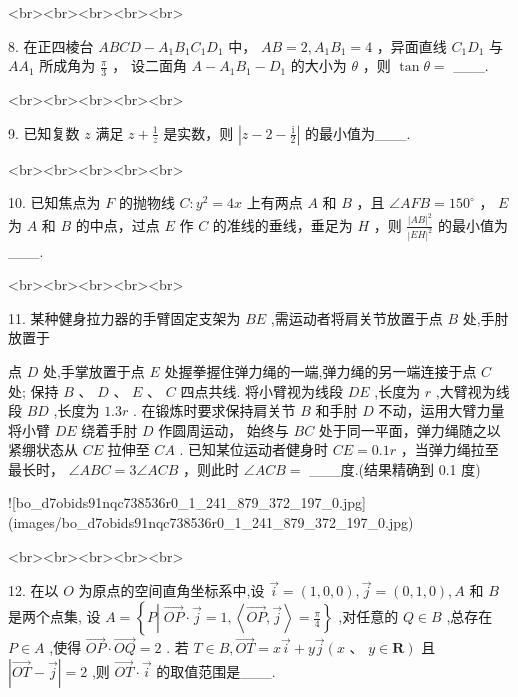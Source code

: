 \documentclass[11pt,a4paper]{article}
\begin{document}
<br><br><br><br><br>


8. 在正四棱台 ${ABCD} - {A}_{1}{B}_{1}{C}_{1}{D}_{1}$ 中， ${AB} = 2,{A}_{1}{B}_{1} = 4$ ，异面直线 ${C}_{1}{D}_{1}$ 与 $A{A}_{1}$ 所成角为 $\frac{\pi }{3}$ ， 设二面角 $A - {A}_{1}{B}_{1} - {D}_{1}$ 的大小为 $\theta$ ，则 $\tan \theta  =$ ___.




<br><br><br><br><br>


9. 已知复数 $z$ 满足 $z + \frac{1}{z}$ 是实数，则 $\left| {z - 2 - \frac{\mathrm{i}}{2}}\right|$ 的最小值为___.




<br><br><br><br><br>


10. 已知焦点为 $F$ 的抛物线 $C : {y}^{2} = {4x}$ 上有两点 $A$ 和 $B$ ，且 $\angle {AFB} = {150}^{ \circ  }$ ， $E$ 为 $A$ 和 $B$ 的中点，过点 $E$ 作 $C$ 的准线的垂线，垂足为 $H$ ，则 $\frac{{\left| AB\right| }^{2}}{{\left| EH\right| }^{2}}$ 的最小值为___.




<br><br><br><br><br>


11. 某种健身拉力器的手臂固定支架为 ${BE}$ ,需运动者将肩关节放置于点 $B$ 处,手肘放置于

点 $D$ 处,手掌放置于点 $E$ 处握拳握住弹力绳的一端,弹力绳的另一端连接于点 $C$ 处; 保持 $B\text{ 、 }D\text{ 、 }E\text{ 、 }C$ 四点共线. 将小臂视为线段 ${DE}$ ,长度为 $r$ ,大臂视为线段 ${BD}$ ,长度为 ${1.3r}$ . 在锻炼时要求保持肩关节 $B$ 和手肘 $D$ 不动，运用大臂力量将小臂 ${DE}$ 绕着手肘 $D$ 作圆周运动， 始终与 ${BC}$ 处于同一平面，弹力绳随之以紧绷状态从 ${CE}$ 拉伸至 ${CA}$ . 已知某位运动者健身时 ${CE} = {0.1r}$ ，当弹力绳拉至最长时， $\angle {ABC} = 3\angle {ACB}$ ，则此时 $\angle {ACB} =$ ___度.(结果精确到 0.1 度)

![bo_d7obids91nqc738536r0_1_241_879_372_197_0.jpg](images/bo_d7obids91nqc738536r0_1_241_879_372_197_0.jpg)




<br><br><br><br><br>


12. 在以 $O$ 为原点的空间直角坐标系中,设 $\overrightarrow{i} = \left( {1,0,0}\right) ,\overrightarrow{j} = \left( {0,1,0}\right) , A$ 和 $B$ 是两个点集, 设 $A = \left\{  {P\left| {\;\overrightarrow{OP} \cdot  \overrightarrow{j} = 1}\right. ,\left\langle  {\overrightarrow{OP},\overrightarrow{j}}\right\rangle   = \frac{\pi }{4}}\right\}$ ,对任意的 $Q \in  B$ ,总存在 $P \in  A$ ,使得 $\overrightarrow{OP} \cdot  \overrightarrow{OQ} = 2$ . 若 $T \in  B,\overrightarrow{OT} = x\overrightarrow{i} + y\overrightarrow{j}\left( {x\text{ 、 }y \in  \mathbf{R}}\right)$ 且 $\left| {\overrightarrow{OT} - \overrightarrow{j}}\right|  = 2$ ,则 $\overrightarrow{OT} \cdot  \overrightarrow{i}$ 的取值范围是___.
\end{document}
